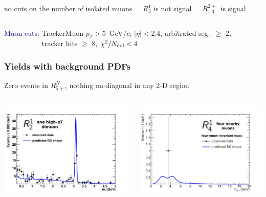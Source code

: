 \documentclass[compress]{beamer}
\newcommand{\s}[1]{{\mbox{\scriptsize #1}}}
\begin{document}
\begin{frame}
\begin{columns}
\centering \scriptsize no cuts on the number of isolated muons

\vspace{0.3 cm} $R^1_3$ is not signal

\vspace{0.2 cm} $R^{2+}_{\cdots 3 \cdots}$ is signal
\end{columns}

\vspace{0.45 cm}
\textcolor{darkblue}{Muon cuts:} TrackerMuon $p_T > 5$~GeV/$c$, $|\eta| < 2.4$, arbitrated seg.\ $\ge$ 2, \\
\textcolor{white}{Muon cuts:} tracker hits $\ge$ 8, $\chi^2/N_\s{dof} < 4$
\end{frame}

\begin{frame}
\frametitle{Yields with background PDFs}

Zero events in $R^N_{5+}$, nothing on-diagonal in any 2-D region

\begin{columns}
\includegraphics[width=\linewidth]{signal_a1_data-bkgpdf2.pdf}

\includegraphics[width=\linewidth]{model_data_a2_m_inv_w22.pdf}
\end{columns}


\end{frame}
\end{document}
